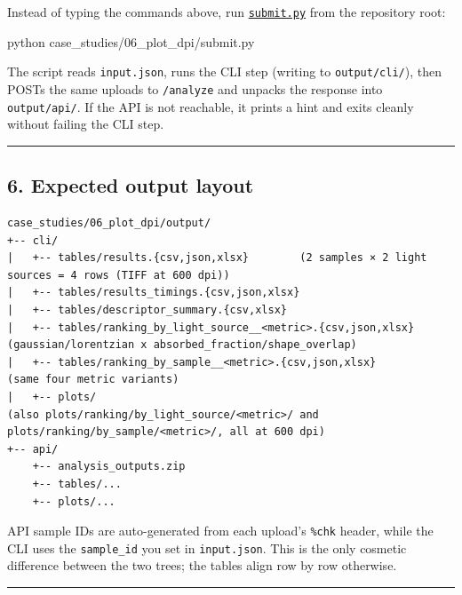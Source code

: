 \documentclass[
  11pt,
]{article}
\newenvironment{Shaded}{}{}
\newcommand{\ExtensionTok}[1]{#1}
\newcommand{\NormalTok}[1]{#1}
\begin{document}
Instead of typing the commands above, run
\href{https://github.com/pinarsyt/overlap-calculator/blob/main/case_studies/06_plot_dpi/submit.py}{\texttt{submit.py}}
from the repository root:

\begin{Shaded}
\begin{Highlighting}[]
\ExtensionTok{python}\NormalTok{ case\_studies/06\_plot\_dpi/submit.py}
\end{Highlighting}
\end{Shaded}

The script reads \texttt{input.json}, runs the CLI step (writing to
\texttt{output/cli/}), then POSTs the same uploads to \texttt{/analyze}
and unpacks the response into \texttt{output/api/}. If the API is not
reachable, it prints a hint and exits cleanly without failing the CLI
step.

\begin{center}\rule{0.5\linewidth}{0.5pt}\end{center}

\hypertarget{6-expected-output-layout}{
\subsection{6. Expected output layout}\label{6-expected-output-layout}}

\begin{verbatim}
case_studies/06_plot_dpi/output/
+-- cli/
|   +-- tables/results.{csv,json,xlsx}        (2 samples × 2 light sources = 4 rows (TIFF at 600 dpi))
|   +-- tables/results_timings.{csv,json,xlsx}
|   +-- tables/descriptor_summary.{csv,xlsx}
|   +-- tables/ranking_by_light_source__<metric>.{csv,json,xlsx}   (gaussian/lorentzian x absorbed_fraction/shape_overlap)
|   +-- tables/ranking_by_sample__<metric>.{csv,json,xlsx}          (same four metric variants)
|   +-- plots/                                                      (also plots/ranking/by_light_source/<metric>/ and plots/ranking/by_sample/<metric>/, all at 600 dpi)
+-- api/
    +-- analysis_outputs.zip
    +-- tables/...
    +-- plots/...
\end{verbatim}

API sample IDs are auto-generated from each upload's \texttt{\%chk}
header, while the CLI uses the \texttt{sample\_id} you set in
\texttt{input.json}. This is the only cosmetic difference between the
two trees; the tables align row by row otherwise.

\begin{center}\rule{0.5\linewidth}{0.5pt}\end{center}
\end{document}
